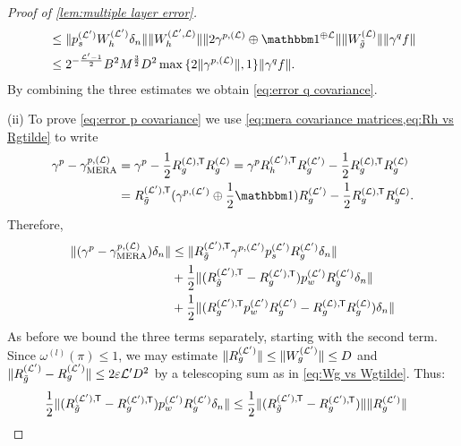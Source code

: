 \documentclass[submission, Phys]{SciPost}
\theoremstyle{definition}
\theoremstyle{remark}
\DeclareMathOperator{\mera}{MERA}
\DeclarePairedDelimiter{\norm}{\lVert}{\rVert}
\newcommand{\op}{\oplus}
\newcommand{\eps}{\varepsilon}
\newcommand{\id}{\mathbbm 1}
\newcommand{\cL}{\mathcal L}
\newcommand*{\tran}{{\mkern-1.5mu\mathsf{T}}}
\newcommand{\wnorm}{D}
\begin{document}
\begin{appendix}
\begin{proof}[Proof of \cref{lem:multiple layer error}]
\begin{equation*}
\begin{aligned}
&\leq \norm{p^{(\cL')}_s W_h^{(\cL')} \delta_n} \norm{W_h^{(\cL',\cL)}} \norm{2\gamma^{p,(\cL)} \op \id^{\op\cL}} \norm{W_{\tilde{g}}^{(\cL)}} \norm{\gamma^q f} \\
&\leq 2^{-\frac{\cL' - 1}{2}} B^2 M^{\frac32} \wnorm^2 \max \, \{ 2\norm{\gamma^{p,(\cL)}}, 1 \} \norm{\gamma^q f}.
\end{aligned}\end{equation*}
By combining the three estimates we obtain \cref{eq:error q covariance}.

(ii) To prove \cref{eq:error p covariance} we use \cref{eq:mera covariance matrices,eq:Rh vs Rgtilde} to write
\begin{equation*}\begin{aligned}
  \gamma^p - \gamma^{p,(\cL)}_{\mera}
&= \gamma^p - \frac12 R_g^{(\cL),\tran} R_g^{(\cL)}
= \gamma^p R^{(\cL'),\tran}_h R_g^{(\cL')} - \frac12 R_g^{(\cL),\tran} R_g^{(\cL)} \\
&= R^{(\cL'),\tran}_{\tilde g} (\gamma^{p,(\cL')} \op \frac12\id) R_g^{(\cL')} - \frac12 R_g^{(\cL),\tran} R_g^{(\cL)}.
\end{aligned}\end{equation*}
Therefore,
\begin{equation*}\begin{aligned}
  \norm{( \gamma^p - \gamma^{p,(\cL)}_{\mera} ) \delta_n}
&\leq \norm{R^{(\cL'),\tran}_{\tilde g} \gamma^{p,(\cL')} p^{(\cL')}_s R_g^{(\cL')} \delta_n} \\
&+ \frac12 \norm{(R^{(\cL'),\tran}_{\tilde g} - R^{(\cL'),\tran}_g) p^{(\cL')}_w R_g^{(\cL')} \delta_n} \\
&+ \frac12 \norm{(R^{(\cL'),\tran}_g p^{(\cL')}_w R_g^{(\cL')} - R_g^{(\cL),\tran} R_g^{(\cL)}) \delta_n}
\end{aligned}\end{equation*}
As before we bound the three terms separately, starting with the second term.
Since $\omega^{(l)}(\pi) \leq 1$, we may estimate $\norm{R^{(\cL')}_g} \leq \norm{W^{(\cL')}_g} \leq D$ and $\norm{R^{(\cL')}_{\tilde{g}} - R^{(\cL')}_g} \leq 2\eps \cL' \wnorm^2$ by a telescoping sum as in \cref{eq:Wg vs Wgtilde}.
Thus:
\begin{equation*}\begin{aligned}
  \frac12 \norm{(R^{(\cL'),\tran}_{\tilde g} - R^{(\cL'),\tran}_g) p^{(\cL')}_w R_g^{(\cL')} \delta_n}
&\leq \frac12 \norm{(R^{(\cL'),\tran}_{\tilde g} - R^{(\cL'),\tran}_g)} \norm{R_g^{(\cL')}}

\end{aligned}
\end{equation*}
\end{proof}
\end{appendix}
\end{document}
